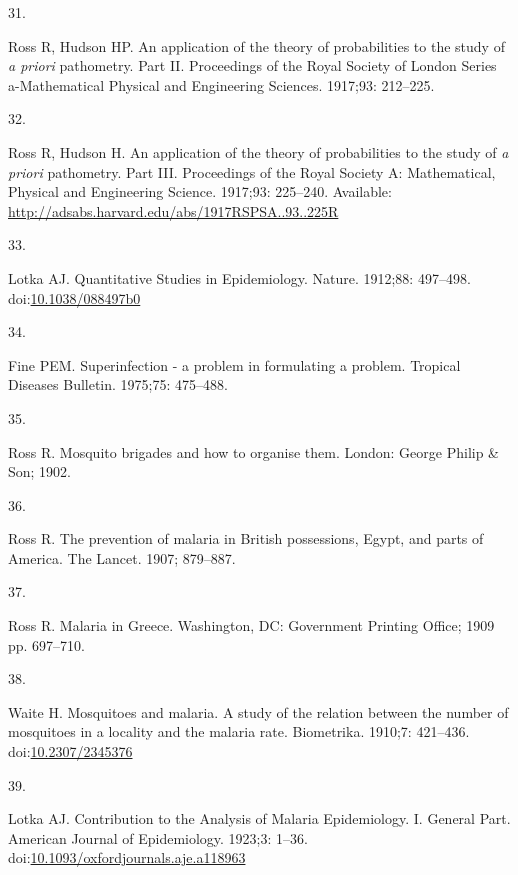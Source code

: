 \documentclass[
]{book}
\newlength{\cslhangindent}
\newlength{\csllabelwidth}
\newlength{\cslentryspacingunit} %
\newenvironment{CSLReferences}[2] %
 {%
  \setlength{\parindent}{0pt}
  \ifodd #1
  \let\oldpar\par
  \def\par{\hangindent=\cslhangindent\oldpar}
  \fi
  \setlength{\parskip}{#2\cslentryspacingunit}
 }%
 {}
\newcommand{\CSLLeftMargin}[1]{\parbox[t]{\csllabelwidth}{#1}}
\newcommand{\CSLRightInline}[1]{\parbox[t]{\linewidth - \csllabelwidth}{#1}\break}
\begin{document}
\begin{CSLReferences}{0}{0}
\leavevmode{}%
\CSLLeftMargin{31. }%
\CSLRightInline{Ross R, Hudson HP. An application of the theory of probabilities to the study of \emph{a priori} pathometry. {Part} {II}. Proceedings of the Royal Society of London Series a-Mathematical Physical and Engineering Sciences. 1917;93: 212--225. }

\leavevmode{}%
\CSLLeftMargin{32. }%
\CSLRightInline{Ross R, Hudson H. An application of the theory of probabilities to the study of \emph{a priori} pathometry. {Part} {III}. Proceedings of the Royal Society A: Mathematical, Physical and Engineering Science. 1917;93: 225--240. Available: \url{http://adsabs.harvard.edu/abs/1917RSPSA..93..225R}}

\leavevmode{}%
\CSLLeftMargin{33. }%
\CSLRightInline{Lotka AJ. Quantitative {Studies} in {Epidemiology}. Nature. 1912;88: 497--498. doi:\href{https://doi.org/10.1038/088497b0}{10.1038/088497b0}}

\leavevmode{}%
\CSLLeftMargin{34. }%
\CSLRightInline{Fine PEM. Superinfection - a problem in formulating a problem. Tropical Diseases Bulletin. 1975;75: 475--488. }

\leavevmode{}%
\CSLLeftMargin{35. }%
\CSLRightInline{Ross R. Mosquito brigades and how to organise them. London: George Philip \& Son; 1902. }

\leavevmode{}%
\CSLLeftMargin{36. }%
\CSLRightInline{Ross R. The prevention of malaria in {British} possessions, {Egypt}, and parts of {America}. The Lancet. 1907; 879--887. }

\leavevmode{}%
\CSLLeftMargin{37. }%
\CSLRightInline{Ross R. Malaria in {Greece}. Washington, DC: Government Printing Office; 1909 pp. 697--710. }

\leavevmode{}%
\CSLLeftMargin{38. }%
\CSLRightInline{Waite H. Mosquitoes and malaria. {A} study of the relation between the number of mosquitoes in a locality and the malaria rate. Biometrika. 1910;7: 421--436. doi:\href{https://doi.org/10.2307/2345376}{10.2307/2345376}}

\leavevmode{}%
\CSLLeftMargin{39. }%
\CSLRightInline{Lotka AJ. Contribution to the {Analysis} of {Malaria} {Epidemiology}. {I}. {General} {Part}. American Journal of Epidemiology. 1923;3: 1--36. doi:\href{https://doi.org/10.1093/oxfordjournals.aje.a118963}{10.1093/oxfordjournals.aje.a118963}}


\end{CSLReferences}
\end{document}
